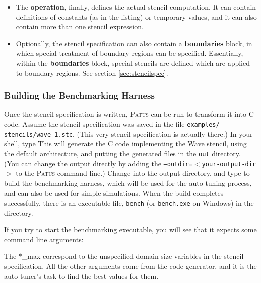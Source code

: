 \begin{itemize}
  \item The \textbf{operation}, finally, defines the actual stencil computation.
    It can contain definitions of constants (as in the listing) or temporary values, and it can also contain more than
    one stencil expression.
  
  \item Optionally, the stencil specification can also contain a \textbf{boundaries} block, in which
    special treatment of boundary regions can be specified. Essentially, within the \textbf{boundaries} block,
    special stencils are defined which are applied to boundary regions. See section \ref{sec:stencilspec}.
\end{itemize}


\subsubsection{Building the Benchmarking Harness}

Once the stencil specification is written, \textsc{Patus} can be run to transform it into C code.
Assume the stencil specification was saved in the file \texttt{examples/ stencils/wave-1.stc}.
(This very stencil specification is actually there.)
In your shell, type
This will generate the C code implementing the Wave stencil, using the default architecture,
and putting the generated files in the
\texttt{out} directory. (You can change the output directly by adding the \texttt{--outdir=$<$your-output-dir$>$}
to the \textsc{Patus} command line.)
Change into the output directory, 
and type  to build the benchmarking harness, which will be used for the auto-tuning process, and can also be
used for simple simulations. When the build completes successfully, there is an executable file,
\texttt{bench} (or \texttt{bench.exe} on Windows) in the directory.

If you try to start the benchmarking executable, you will see that it expects some command line arguments:

The $\ast$\_max correspond to the unspecified domain size variables in the stencil specification.
All the other arguments come from the code generator, and it is the auto-tuner's task to find the best values
for them.



